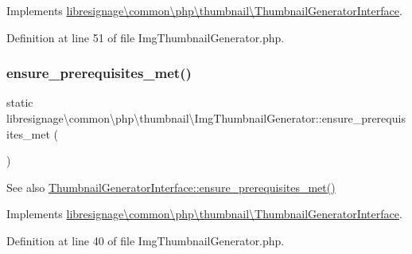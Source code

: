 Implements \hyperlink{interfacelibresignage_1_1common_1_1php_1_1thumbnail_1_1ThumbnailGeneratorInterface_ac4301d4bc3ac1011243a81a9ad8c68d5}{libresignage\textbackslash{}common\textbackslash{}php\textbackslash{}thumbnail\textbackslash{}\+Thumbnail\+Generator\+Interface}.



Definition at line 51 of file Img\+Thumbnail\+Generator.\+php.

\mbox{\label{classlibresignage_1_1common_1_1php_1_1thumbnail_1_1ImgThumbnailGenerator_aaf9ec891b0098f04280029338054438d}} 
\subsubsection{\texorpdfstring{ensure\+\_\+prerequisites\+\_\+met()}{ensure\_prerequisites\_met()}}
{\footnotesize\ttfamily static libresignage\textbackslash{}common\textbackslash{}php\textbackslash{}thumbnail\textbackslash{}\+Img\+Thumbnail\+Generator\+::ensure\+\_\+prerequisites\+\_\+met (\begin{DoxyParamCaption}{ }\end{DoxyParamCaption})\hspace{0.3cm}{\ttfamily [static]}}

\begin{DoxySeeAlso}{See also}
\hyperlink{interfacelibresignage_1_1common_1_1php_1_1thumbnail_1_1ThumbnailGeneratorInterface_ada1412d696863bb01ad24dd47a3eba41}{Thumbnail\+Generator\+Interface\+::ensure\+\_\+prerequisites\+\_\+met()} 
\end{DoxySeeAlso}


Implements \hyperlink{interfacelibresignage_1_1common_1_1php_1_1thumbnail_1_1ThumbnailGeneratorInterface_ada1412d696863bb01ad24dd47a3eba41}{libresignage\textbackslash{}common\textbackslash{}php\textbackslash{}thumbnail\textbackslash{}\+Thumbnail\+Generator\+Interface}.



Definition at line 40 of file Img\+Thumbnail\+Generator.\+php.

